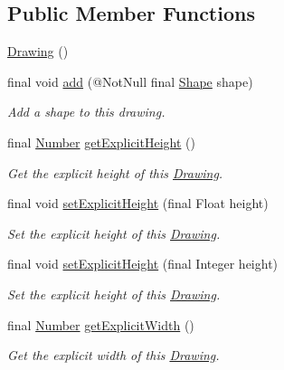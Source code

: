 \subsection*{Public Member Functions}
\begin{DoxyCompactItemize}
\item 
\hyperlink{classcom_1_1aarrelaakso_1_1drawl_1_1_drawing_adc398fbdb9acaa2c09ab8f048ff45109}{Drawing} ()
\item 
final void \hyperlink{classcom_1_1aarrelaakso_1_1drawl_1_1_drawing_abb794d2aac631a7e20f3cd6948d117fe}{add} (@Not\+Null final \hyperlink{classcom_1_1aarrelaakso_1_1drawl_1_1_shape}{Shape} shape)
\begin{DoxyCompactList}\small\item\em Add a shape to this drawing. \end{DoxyCompactList}\item 
final \hyperlink{interfacecom_1_1aarrelaakso_1_1drawl_1_1_number}{Number} \hyperlink{classcom_1_1aarrelaakso_1_1drawl_1_1_drawing_ade424cd3d355473603555ad6ce746e23}{get\+Explicit\+Height} ()
\begin{DoxyCompactList}\small\item\em Get the explicit height of this \hyperlink{classcom_1_1aarrelaakso_1_1drawl_1_1_drawing}{Drawing}. \end{DoxyCompactList}\item 
final void \hyperlink{classcom_1_1aarrelaakso_1_1drawl_1_1_drawing_a4a88952ac7f26d5a3be9aa3d32e2643a}{set\+Explicit\+Height} (final Float height)
\begin{DoxyCompactList}\small\item\em Set the explicit height of this \hyperlink{classcom_1_1aarrelaakso_1_1drawl_1_1_drawing}{Drawing}. \end{DoxyCompactList}\item 
final void \hyperlink{classcom_1_1aarrelaakso_1_1drawl_1_1_drawing_a58214bce0e8aa1f15a88f6daaf0e85c6}{set\+Explicit\+Height} (final Integer height)
\begin{DoxyCompactList}\small\item\em Set the explicit height of this \hyperlink{classcom_1_1aarrelaakso_1_1drawl_1_1_drawing}{Drawing}. \end{DoxyCompactList}\item 
final \hyperlink{interfacecom_1_1aarrelaakso_1_1drawl_1_1_number}{Number} \hyperlink{classcom_1_1aarrelaakso_1_1drawl_1_1_drawing_a0de258c25c1d13e3c2d71ab6a90606ef}{get\+Explicit\+Width} ()
\begin{DoxyCompactList}\small\item\em Get the explicit width of this \hyperlink{classcom_1_1aarrelaakso_1_1drawl_1_1_drawing}{Drawing}. \end{DoxyCompactList}\item 

\end{DoxyCompactItemize}
